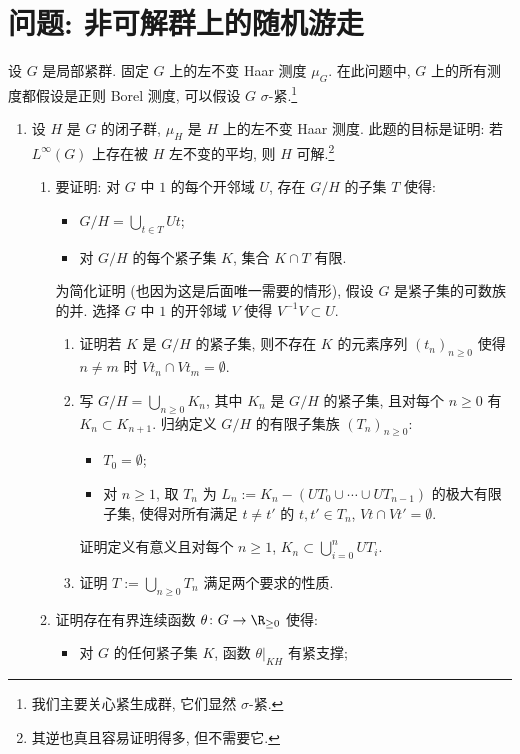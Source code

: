 \section{问题: 非可解群上的随机游走}
设 $G$ 是局部紧群. 固定 $G$ 上的左不变 Haar 测度 $\mu_G$. 在此问题中, $G$ 上的所有测度都假设是正则 Borel 测度, 可以假设 $G$ $\sigma$-紧.\footnote{我们主要关心紧生成群, 它们显然 $\sigma$-紧.}
\begin{enumerate}
\item[(1)] 设 $H$ 是 $G$ 的闭子群, $\mu_H$ 是 $H$ 上的左不变 Haar 测度. 此题的目标是证明: 若 $L^{\infty}(G)$ 上存在被 $H$ 左不变的平均, 则 $H$ 可解.\footnote{其逆也真且容易证明得多, 但不需要它.}
  \begin{enumerate}
  \item[(a)] 要证明: 对 $G$ 中 $1$ 的每个开邻域 $U$, 存在 $G/H$ 的子集 $T$ 使得:
    \begin{itemize}
    \item $G/H = \bigcup_{t \in T}Ut$;
    \item 对 $G/H$ 的每个紧子集 $K$, 集合 $K \cap T$ 有限.
    \end{itemize}
    为简化证明 (也因为这是后面唯一需要的情形), 假设 $G$ 是紧子集的可数族的并. 选择 $G$ 中 $1$ 的开邻域 $V$ 使得 $V^{-1}V \subset U$.
    \begin{enumerate}
    \item[(i)] 证明若 $K$ 是 $G/H$ 的紧子集, 则不存在 $K$ 的元素序列 $(t_n)_{n \geq 0}$ 使得 $n \neq m$ 时 $Vt_n \cap Vt_m = \emptyset$.
    \item[(ii)] 写 $G/H = \bigcup_{n \geq 0}K_n$, 其中 $K_n$ 是 $G/H$ 的紧子集, 且对每个 $n \geq 0$ 有 $K_n \subset K_{n+1}$. 归纳定义 $G/H$ 的有限子集族 $(T_n)_{n \geq 0}$:
      \begin{itemize}
      \item $T_0 = \emptyset$;
      \item 对 $n \geq 1$, 取 $T_n$ 为 $L_n := K_n - (UT_0 \cup \cdots \cup UT_{n-1})$ 的极大有限子集, 使得对所有满足 $t \neq t'$ 的 $t, t' \in T_n$, $Vt \cap Vt' = \emptyset$.
      \end{itemize}
      证明定义有意义且对每个 $n \geq 1$, $K_n \subset \bigcup_{i=0}^n UT_i$.
    \item[(iii)] 证明 $T := \bigcup_{n \geq 0}T_n$ 满足两个要求的性质.
    \end{enumerate}
  \item[(b)] 证明存在有界连续函数 $\theta \colon G \to \R_{\geq 0}$ 使得:
    \begin{itemize}
    \item 对 $G$ 的任何紧子集 $K$, 函数 $\theta|_{KH}$ 有紧支撑;

\end{itemize}
\end{enumerate}
\end{enumerate}
